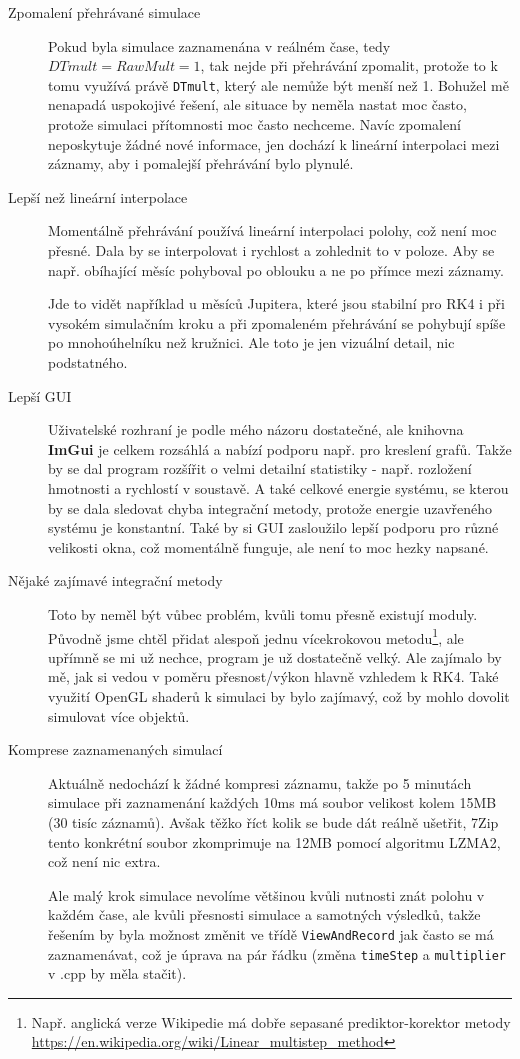 \begin{description}
	\item[Zpomalení přehrávané simulace] Pokud byla simulace zaznamenána v reálném čase, tedy $ DTmult=RawMult=1 $, tak nejde při přehrávání zpomalit, protože to k tomu využívá právě \texttt{DTmult}, který ale nemůže být menší než 1. Bohužel mě nenapadá uspokojivé řešení, ale situace by neměla nastat moc často, protože simulaci přítomnosti moc často nechceme. Navíc zpomalení neposkytuje žádné nové informace, jen dochází k lineární interpolaci mezi záznamy, aby i pomalejší přehrávání bylo plynulé.
	
	\item[Lepší než lineární interpolace] Momentálně přehrávání používá lineární interpolaci polohy, což není moc přesné. Dala by se interpolovat i rychlost a zohlednit to v poloze. Aby se např. obíhající měsíc pohyboval po oblouku a ne po přímce mezi záznamy.
	
	Jde to vidět například u měsíců Jupitera, které jsou stabilní pro RK4 i při vysokém simulačním kroku a při zpomaleném přehrávání se pohybují spíše po mnohoúhelníku než kružnici. Ale toto je jen vizuální detail, nic podstatného.
	
	\item[Lepší GUI] Uživatelské rozhraní je podle mého názoru dostatečné, ale knihovna \textbf{ImGui} je celkem rozsáhlá a nabízí podporu např. pro kreslení grafů. Takže by se dal program rozšířit o velmi detailní statistiky - např. rozložení hmotnosti a rychlostí v soustavě. A také celkové energie systému, se kterou by se dala sledovat chyba integrační metody, protože energie uzavřeného systému je konstantní. Také by si GUI zasloužilo lepší podporu pro různé velikosti okna, což momentálně funguje, ale není to moc hezky napsané.
	
	\item[Nějaké zajímavé integrační metody] Toto by neměl být vůbec problém, kvůli tomu přesně existují moduly. Původně jsme chtěl přidat alespoň jednu vícekrokovou metodu\footnote{Např. anglická verze Wikipedie má dobře sepasané prediktor-korektor metody \url{https://en.wikipedia.org/wiki/Linear_multistep_method}}, ale upřímně se mi už nechce, program je už dostatečně velký. Ale zajímalo by mě, jak si vedou v poměru přesnost/výkon hlavně vzhledem k RK4.
	Také využití OpenGL shaderů k simulaci by bylo zajímavý, což by mohlo dovolit simulovat více objektů.
	\item[Komprese zaznamenaných simulací] Aktuálně nedochází k žádné kompresi záznamu, takže po 5 minutách simulace při zaznamenání každých 10ms má soubor velikost kolem 15MB (30 tisíc záznamů). Avšak těžko říct kolik se bude dát reálně ušetřit, 7Zip tento konkrétní soubor zkomprimuje na 12MB pomocí algoritmu LZMA2, což není nic extra. 
	
	Ale malý krok simulace nevolíme většinou kvůli nutnosti znát polohu v každém čase, ale kvůli přesnosti simulace a samotných výsledků, takže řešením by byla možnost změnit ve třídě \texttt{ViewAndRecord} jak často se má zaznamenávat, což je úprava na pár řádku (změna \texttt{timeStep} a \texttt{multiplier} v .cpp by měla stačit).
	
\end{description}